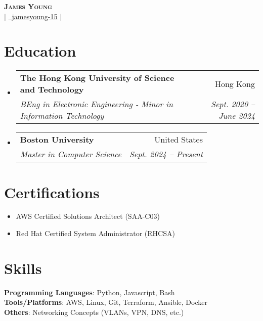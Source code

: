 \documentclass[letterpaper,12pt]{article}
\makeatletter
\newcommand{\resumeSubheading}[4]{
  \vspace{-1pt}\item
    \begin{tabular*}{0.98\textwidth}[t]{l@{\extracolsep{\fill}}r}
      \textbf{#1} & #2 \\
      \textit{\small#3} & \textit{\small #4} \\
    \end{tabular*}\vspace{-7pt}
}
\newcommand{\resumeSubHeadingListStart}{\begin{itemize}[leftmargin=0.05in, label={}]}
\newcommand{\resumeSubHeadingListEnd}{\end{itemize}}
\makeatother
\begin{document}
\begin{center}
    \textbf{\Huge \scshape James Young} \\ \vspace{3pt}
    \href{mailto:jyyoung@bu.edu}{} $|$ 
    \href{https://github.com/jamesyoung-15} {\faGithub\ {jamesyoung-15}} $|$
    \href{https://linkedin.com/in/jamesyyoung}{}
\end{center}


\section{Education}
  \resumeSubHeadingListStart
    \resumeSubheading
      {The Hong Kong University of Science and Technology}{Hong Kong}
      {BEng in Electronic Engineering - Minor in Information Technology}{Sept. 2020 -- June 2024}
  \resumeSubHeadingListEnd
  \resumeSubHeadingListStart
    \resumeSubheading
      {Boston University}{United States}
      {Master in Computer Science}{Sept. 2024 -- Present}
  \resumeSubHeadingListEnd

\section{Certifications}
\vspace{1pt}
        \begin{itemize}[itemsep=-1pt, parsep=3pt, leftmargin=0.20in]
        \small
            \item AWS Certified Solutions Architect (SAA-C03)
            \item Red Hat Certified System Administrator (RHCSA)
        \end{itemize}

\section{Skills}
 \begin{itemize}[leftmargin=0.05in, label={}]
    \small{\item{
     \textbf{Programming Languages}{: Python, Javascript, Bash} \\
     \textbf{Tools/Platforms}{: AWS, Linux, Git, Terraform, Ansible, Docker} \\ 
     \textbf{Others}{: Networking Concepts (VLANs, VPN, DNS, etc.)} \\
    }}
 \end{itemize}
\end{document}
